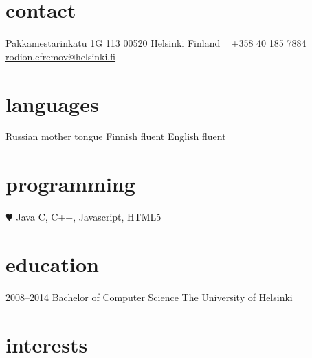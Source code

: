 \documentclass[]{friggeri-cv} %
\begin{document}


\begin{aside} %
\section{contact}
Pakkamestarinkatu 1G 113
00520 Helsinki
Finland
~
+358 40 185 7884
~
\href{mailto:rodion.efremov@helsinki.fi}{rodion.efremov@helsinki.fi}
\section{languages}
Russian mother tongue
Finnish fluent
English fluent
\section{programming}
{\color{red} $\varheartsuit$} Java
C, C++, Javascript, HTML5
\end{aside}


\section{education}

\begin{entrylist}
{2008--2014}
{Bachelor {\normalfont of Computer Science}}
{The University of Helsinki}
\end{entrylist}


\section{interests}
\end{document}
